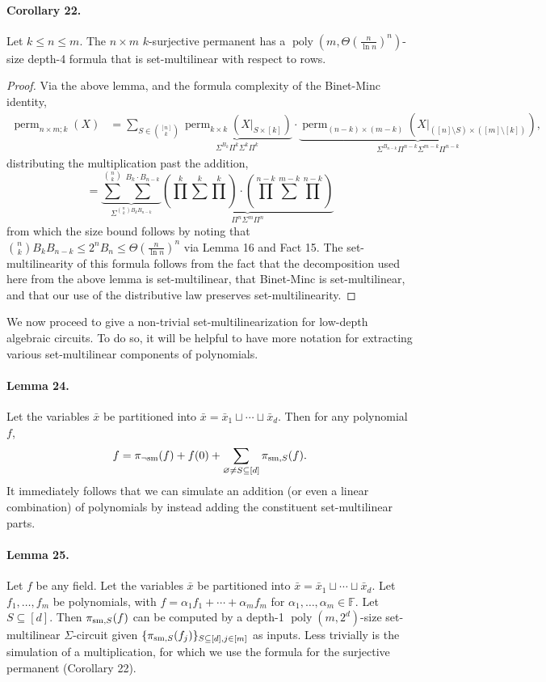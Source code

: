 \paragraph{Corollary 22.} Let $k\le n\le m$. The $n\times m$ $k$-surjective permanent has a $\operatorname{poly}(m,\Theta(\frac n{\ln n})^n)$-size depth-4 formula that is set-multilinear with respect to rows.
\begin{proof}
Via the above lemma, and the formula complexity of the Binet-Minc identity,
\begin{align*}
\operatorname{perm}_{n\times m;k}(X)&=\sum_{S\in\binom{[n]}k}\underbrace{\operatorname{perm}_{k\times k}(X|_{S\times[k]})}_{\Sigma^{B_k}\Pi^k\Sigma^k\Pi^k}\cdot\underbrace{\operatorname{perm}_{(n-k)\times(m-k)}(X|_{([n]\setminus S)\times([m]\setminus[k])})}_{\Sigma^{B_{n-k}}\Pi^{n-k}\Sigma^{m-k}\Pi^{n-k}},
\end{align*}
distributing the multiplication past the addition,
\[=\underbrace{\sum^{\binom nk}\sum^{B_k\cdot B_{n-k}}}_{\Sigma^{\binom nk B_k B_{n-k}}}\underbrace{\left(\prod^k\sum^k\prod^k\right)\cdot\left(\prod^{n-k}\sum^{m-k}\prod^{n-k}\right)}_{\Pi^n\Sigma^m\Pi^n}\]
from which the size bound follows by noting that $\binom nk B_k B_{n-k}\le2^n B_n\le\Theta(\frac n{\ln n})^n$ via Lemma 16 and Fact 15.
The set-multilinearity of this formula follows from the fact that the decomposition used here from the above lemma is set-multilinear, that Binet-Minc is set-multilinear, and that our use of the distributive law preserves set-multilinearity.
\end{proof}
We now proceed to give a non-trivial set-multilinearization for low-depth algebraic circuits. To do so, it will be helpful to have more notation for extracting various set-multilinear components of polynomials.
\paragraph{Lemma 24.} Let the variables $\bar x$ be partitioned into $\bar x=\bar x_1\sqcup\cdots\sqcup\bar x_d$. Then for any polynomial $f$,
\[f=\pi_{\neg{\rm sm}}(f)+f(0)+\sum_{\varnothing\ne S\subseteq[d]}\pi_{{\rm sm},S}(f).\]
It immediately follows that we can simulate an addition (or even a linear combination) of polynomials by instead adding the constituent set-multilinear parts.
\paragraph{Lemma 25.} Let $f$ be any field. Let the variables $\bar x$ be partitioned into $\bar x=\bar x_1\sqcup\cdots\sqcup\bar x_d$. Let $f_1,\ldots,f_m$ be polynomials, with $f=\alpha_1f_1+\cdots+\alpha_m f_m$ for $\alpha_1,\ldots,\alpha_m\in\mathbb F$. Let $S\subseteq[d]$. Then $\pi_{{\rm sm},S}(f)$ can be computed by a depth-1 $\operatorname{poly}(m,2^d)$-size set-multilinear $\Sigma$-circuit given $\{\pi_{{\rm sm},S}(f_j)\}_{S\subseteq[d],j\in[m]}$ as inputs.
Less trivially is the simulation of a multiplication, for which we use the formula for the surjective permanent (Corollary 22).
